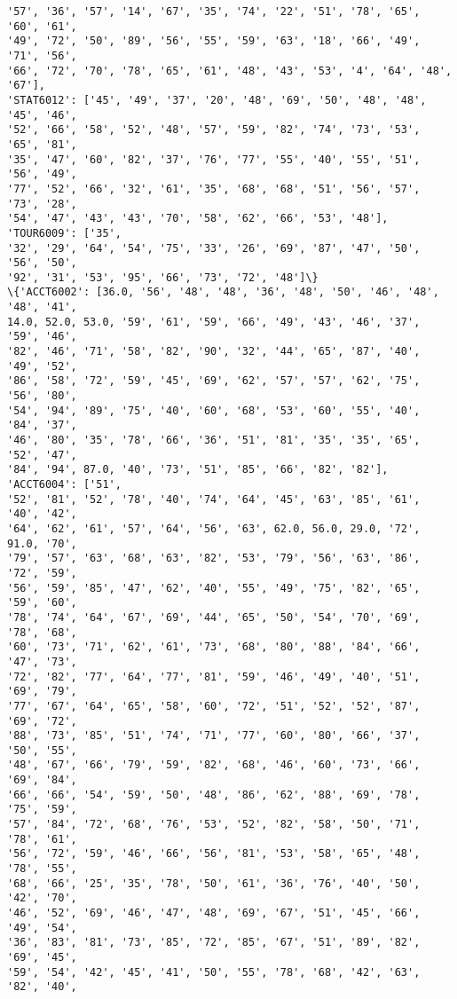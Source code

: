 \documentclass[11pt]{article}
\begin{document}
\begin{Verbatim}[commandchars=\\\{\}]
'57', '36', '57', '14', '67', '35', '74', '22', '51', '78', '65', '60', '61',
'49', '72', '50', '89', '56', '55', '59', '63', '18', '66', '49', '71', '56',
'66', '72', '70', '78', '65', '61', '48', '43', '53', '4', '64', '48', '67'],
'STAT6012': ['45', '49', '37', '20', '48', '69', '50', '48', '48', '45', '46',
'52', '66', '58', '52', '48', '57', '59', '82', '74', '73', '53', '65', '81',
'35', '47', '60', '82', '37', '76', '77', '55', '40', '55', '51', '56', '49',
'77', '52', '66', '32', '61', '35', '68', '68', '51', '56', '57', '73', '28',
'54', '47', '43', '43', '70', '58', '62', '66', '53', '48'], 'TOUR6009': ['35',
'32', '29', '64', '54', '75', '33', '26', '69', '87', '47', '50', '56', '50',
'92', '31', '53', '95', '66', '73', '72', '48']\}
\{'ACCT6002': [36.0, '56', '48', '48', '36', '48', '50', '46', '48', '48', '41',
14.0, 52.0, 53.0, '59', '61', '59', '66', '49', '43', '46', '37', '59', '46',
'82', '46', '71', '58', '82', '90', '32', '44', '65', '87', '40', '49', '52',
'86', '58', '72', '59', '45', '69', '62', '57', '57', '62', '75', '56', '80',
'54', '94', '89', '75', '40', '60', '68', '53', '60', '55', '40', '84', '37',
'46', '80', '35', '78', '66', '36', '51', '81', '35', '35', '65', '52', '47',
'84', '94', 87.0, '40', '73', '51', '85', '66', '82', '82'], 'ACCT6004': ['51',
'52', '81', '52', '78', '40', '74', '64', '45', '63', '85', '61', '40', '42',
'64', '62', '61', '57', '64', '56', '63', 62.0, 56.0, 29.0, '72', 91.0, '70',
'79', '57', '63', '68', '63', '82', '53', '79', '56', '63', '86', '72', '59',
'56', '59', '85', '47', '62', '40', '55', '49', '75', '82', '65', '59', '60',
'78', '74', '64', '67', '69', '44', '65', '50', '54', '70', '69', '78', '68',
'60', '73', '71', '62', '61', '73', '68', '80', '88', '84', '66', '47', '73',
'72', '82', '77', '64', '77', '81', '59', '46', '49', '40', '51', '69', '79',
'77', '67', '64', '65', '58', '60', '72', '51', '52', '52', '87', '69', '72',
'88', '73', '85', '51', '74', '71', '77', '60', '80', '66', '37', '50', '55',
'48', '67', '66', '79', '59', '82', '68', '46', '60', '73', '66', '69', '84',
'66', '66', '54', '59', '50', '48', '86', '62', '88', '69', '78', '75', '59',
'57', '84', '72', '68', '76', '53', '52', '82', '58', '50', '71', '78', '61',
'56', '72', '59', '46', '66', '56', '81', '53', '58', '65', '48', '78', '55',
'68', '66', '25', '35', '78', '50', '61', '36', '76', '40', '50', '42', '70',
'46', '52', '69', '46', '47', '48', '69', '67', '51', '45', '66', '49', '54',
'36', '83', '81', '73', '85', '72', '85', '67', '51', '89', '82', '69', '45',
'59', '54', '42', '45', '41', '50', '55', '78', '68', '42', '63', '82', '40',

\end{Verbatim}
\end{document}
